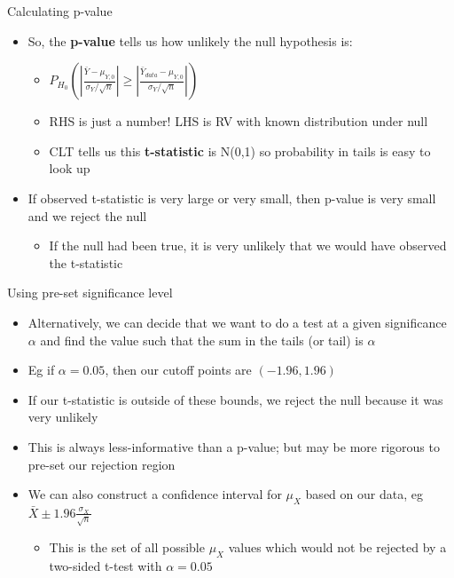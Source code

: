 \documentclass[aspectratio=169]{beamer}
\begin{document}
\begin{frame}{Calculating p-value}
    \begin{itemize}
        \item So, the \textbf{p-value} tells us how unlikely the null hypothesis is:
        \begin{itemize}
            \item  $P_{H_0}(|\frac{\bar{Y} - \mu_{Y,0}}{\sigma_Y/\sqrt{n}}|\geq |\frac{\bar{Y}_{data} - \mu_{Y,0}}{\sigma_Y/\sqrt{n}}|)$
            \item RHS is just a number! LHS is RV with known distribution under null
            \item CLT tells us this \textbf{t-statistic} is N(0,1) so probability in tails is easy to look up
        \end{itemize}
        \item If observed t-statistic is very large or very small, then p-value is very small and we reject the null
        \begin{itemize}
            \item If the null had been true, it is very unlikely that we would have observed the t-statistic
        \end{itemize}
    \end{itemize}
\end{frame}

\begin{frame}{Using pre-set significance level}
    \begin{itemize}
        \item Alternatively, we can decide that we want to do a test at a given significance $\alpha$ and find the value such that the sum in the tails (or tail) is $\alpha$
        \item Eg if $\alpha=0.05$, then our cutoff points are $(-1.96,1.96)$
        \item If our t-statistic is outside of these bounds, we reject the null because it was very unlikely
        \item This is always less-informative than a p-value; but may be more rigorous to pre-set our rejection region
        \item We can also construct a confidence interval for $\mu_X$ based on our data, eg $\bar{X} \pm 1.96 \frac{\sigma_X}{\sqrt{n}}$
        \begin{itemize}
            \item This is the set of all possible $\mu_X$ values which would not be rejected by a two-sided t-test with $\alpha=0.05$
        \end{itemize}
    \end{itemize}
\end{frame}
\end{document}
